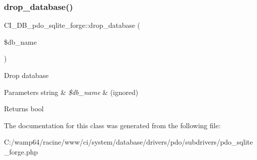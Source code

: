 \subsubsection{\texorpdfstring{drop\+\_\+database()}{drop\_database()}}
{\footnotesize\ttfamily C\+I\+\_\+\+D\+B\+\_\+pdo\+\_\+sqlite\+\_\+forge\+::drop\+\_\+database (\begin{DoxyParamCaption}\item[{}]{\$db\+\_\+name }\end{DoxyParamCaption})}

Drop database


\begin{DoxyParams}[1]{Parameters}
string & {\em \$db\+\_\+name} & (ignored) \\
\hline
\end{DoxyParams}
\begin{DoxyReturn}{Returns}
bool 
\end{DoxyReturn}


The documentation for this class was generated from the following file\+:\begin{DoxyCompactItemize}
\item 
C\+:/wamp64/racine/www/ci/system/database/drivers/pdo/subdrivers/pdo\+\_\+sqlite\+\_\+forge.\+php\end{DoxyCompactItemize}

